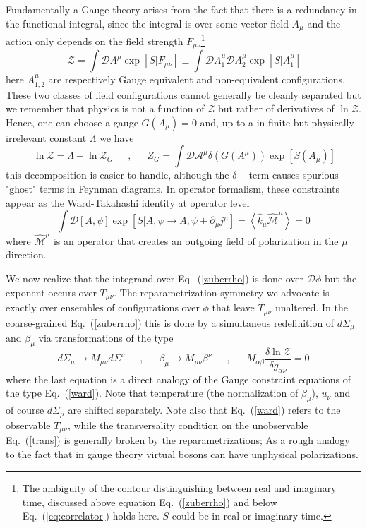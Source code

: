 \documentclass[12pt,onecolumn,showpacs,amssymb,aps,nofootinbib,floatfix]{revtex4-2}
\newcommand{\ave}[1]{\left\langle #1 \right\rangle}
\renewcommand{\eqref}[1]{Eq.~(\ref{#1})}
\newcommand{\eqcomma}{\phantom{AA},\phantom{AA}}
\newcommand{\lnz}{\ln \mathcal{Z}}
\begin{document}
Fundamentally a Gauge theory arises from the fact that there is a redundancy in the functional integral, since the integral is over some vector field $A_\mu$ and the action only depends on the field strength $F_{\mu \nu}$\footnote{The ambiguity of the contour distinguishing between real and imaginary time, discussed above equation \eqref{zuberrho} and below \eqref{eq:correlator} holds here. $S$ could be in real or imaginary time.}
\[\
\mathcal{Z} = \int \mathcal{D} A^{\mu} \exp\left[ S[F_{\mu \nu} \right] \equiv \int \mathcal{D} A^{\mu}_1 \mathcal{D} A^{\mu}_2 \exp\left[ S[A^\mu_1 \right]     \]
here $A^\mu_{1,2}$ are respectively Gauge equivalent and non-equivalent configurations.     These two classes of field configurations cannot generally be cleanly separated but we remember that physics is not a function of $\mathcal{Z}$ but rather of derivatives of $\lnz$.   Hence, one can choose a gauge $G(A_\mu)=0$ and, up to a in finite but physically irrelevant constant $\Lambda$ we have
\[\   \lnz = \Lambda + \lnz_G \eqcomma Z_G = \int \mathcal{D} \mathcal{A^\mu} \delta \left(   G(A^\mu) \right) \exp \left[ S(A_\mu) \right] \]
this decomposition is easier to handle, although the $\delta-$term causes spurious "ghost" terms in Feynman diagrams.   In operator formalism, these constraints appear as the Ward-Takahashi identity at operator level
\begin{equation}
  \label{wardtak}
\int \mathcal{D}[A,\psi] \exp\left[ S[A,\psi\rightarrow A,\psi+\partial_\mu j^\mu \right] = \ave{\hat{k}_\mu \hat{\mathcal{M}}^{\mu}}=0
\end{equation}
where $\hat{\mathcal{M}}^\mu$ is an operator that creates an outgoing  field of polarization in the $\mu$ direction.

We now realize that the integrand over \eqref{zuberrho} is done over $\mathcal{D}\phi$ but the exponent occurs over $T_{\mu \nu}$.    The reparametrization symmetry we advocate is exactly over ensembles of configurations over $\phi$ that leave $T_{\mu \nu}$ unaltered.  In the coarse-grained \eqref{zuberrho} this is done by a simultaneus redefinition of $d\Sigma_\mu$ and $\beta_\mu$ via transformations of the type
\begin{equation}
  \label{msigmadef}
  d\Sigma_\mu \rightarrow M_{\mu \nu}d\Sigma^\nu \eqcomma \beta_\mu \rightarrow M_{\mu \nu} \beta^\nu \eqcomma M_{\alpha \beta} \frac{\delta \lnz}{\delta g_{\alpha \nu}}=0
\end{equation}
where the last equation is a direct analogy of the Gauge constraint equations of the type \eqref{ward}.
Note that temperature (the normalization of $\beta_\mu$), $u_\nu$ and of course $d\Sigma_\mu$ are shifted separately.\color{black}  Note also that \eqref{ward} refers to the observable $T_{\mu \nu}$, while the transversality condition on the unobservable \eqref{trans} is generally broken by the reparametrizations;  As a rough analogy to the fact that in gauge theory virtual bosons can have unphysical polarizations. \color{black}
\end{document}
